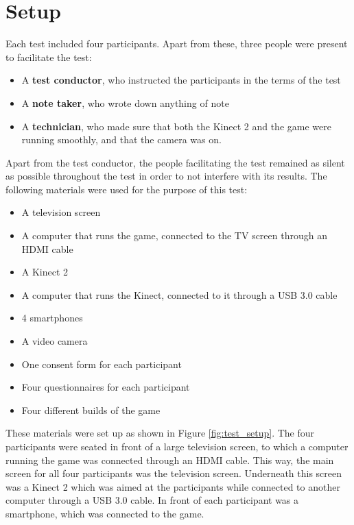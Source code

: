 \section{Setup}
Each test included four participants. Apart from these, three people were present to facilitate the test:

\begin{itemize}
	\item A \textbf{test conductor}, who instructed the participants in the terms of the test
	\item A \textbf{note taker}, who wrote down anything of note
	\item A \textbf{technician}, who made sure that both the Kinect 2 and the game were running smoothly, and that the camera was on.
\end{itemize}

Apart from the test conductor, the people facilitating the test remained as silent as possible throughout the test in order to not interfere with its results. The following materials were used for the purpose of this test:

\begin{itemize}
	\item A television screen
	\item A computer that runs the game, connected to the TV screen through an HDMI cable
	\item A Kinect 2
	\item A computer that runs the Kinect, connected to it through a USB 3.0 cable
	\item 4 smartphones
	\item A video camera
	\item One consent form for each participant
	\item Four questionnaires for each participant
	\item Four different builds of the game
\end{itemize}

These materials were set up as shown in Figure \ref{fig:test_setup}. The four participants were seated in front of a large television screen, to which a computer running the game was connected through an HDMI cable. This way, the main screen for all four participants was the television screen. Underneath this screen was a Kinect 2 which was aimed at the participants while connected to another computer through a USB 3.0 cable. In front of each participant was a smartphone, which was connected to the game.

